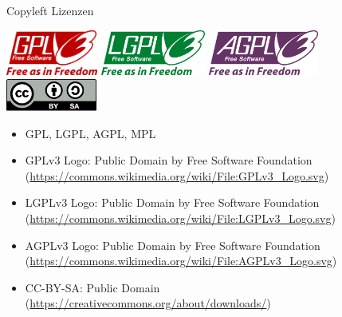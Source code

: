\begin{frame}{Copyleft Lizenzen}
	\begin{center}
		\pause
		\includegraphics[height=1.5cm]{res/gpl-v3-logo.pdf}
		\hfill
		\pause
		\includegraphics[height=1.5cm]{res/lgpl-v3-logo.pdf}
		\hfill
		\pause
		\includegraphics[height=1.5cm]{res/agpl-v3-logo.pdf}
		\\
		\vspace{1cm}
		\pause
		\includegraphics[width=3cm]{res/cc-by-sa.pdf}
	\end{center}
\end{frame}
\note
{
	\begin{itemize}
		\item GPL, LGPL, AGPL, MPL
		\item GPLv3 Logo: Public Domain by Free Software Foundation (\url{https://commons.wikimedia.org/wiki/File:GPLv3\_Logo.svg})
		\item LGPLv3 Logo: Public Domain by Free Software Foundation (\url{https://commons.wikimedia.org/wiki/File:LGPLv3\_Logo.svg})
		\item AGPLv3 Logo: Public Domain by Free Software Foundation (\url{https://commons.wikimedia.org/wiki/File:AGPLv3\_Logo.svg})
		\item CC-BY-SA: Public Domain (\url{https://creativecommons.org/about/downloads/})
	\end{itemize}
}

